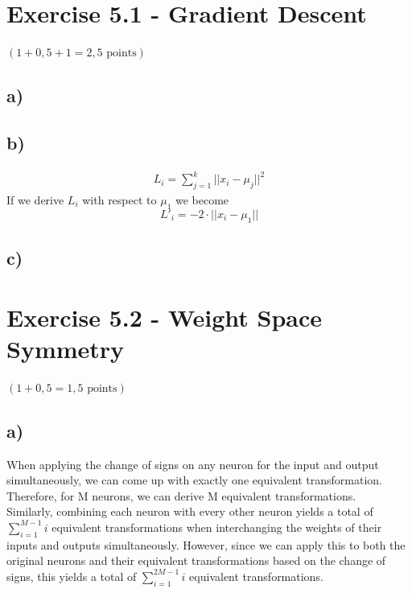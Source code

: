 \documentclass[a4paper]{article}
\begin{document}





\section*{Exercise 5.1 - Gradient Descent}
$(1+0,5+1 = 2,5 \text{ points})$
    \subsection*{a)}
        
        
        
    \subsection*{b)}
        \begin{align}
            L_i = \sum\limits_{j=1}^k ||x_i -\mu_j||^2
        \end{align}
        If we derive $L_i$ with respect to $\mu_1$ we become
        $$L'_i = -2 \cdot ||x_i - \mu_1||$$
        
        
    \subsection*{c)}
        
    
    
        


\newpage
\section*{Exercise 5.2 - Weight Space Symmetry}
$(1+0,5 = 1,5 \text{ points})$
    \subsection*{a)}
    When applying the change of signs on any neuron for the input and output simultaneously, we can come up with exactly one equivalent transformation. Therefore, for M neurons, we can derive M equivalent transformations.\\
    Similarly, combining each neuron with every other neuron yields a total of $\sum_{i=1}^{M-1} i$ equivalent transformations when interchanging the weights of their inputs and outputs simultaneously. However, since we can apply this to both the original neurons and their equivalent transformations based on the change of signs, this yields a total of $\sum_{i=1}^{2M-1} i$ equivalent transformations.
    
\end{document}
